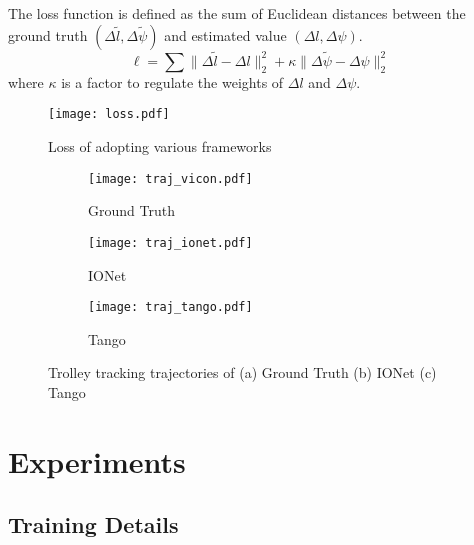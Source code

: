 \documentclass[letterpaper]{article}
\begin{document}
	The loss function is defined as the sum of Euclidean distances between the ground truth $(\Delta \tilde{l}, \Delta \tilde{\psi})$ and estimated value $(\Delta l, \Delta \psi)$. 
	\begin{equation}
    	\ell=\sum \|\Delta \tilde{l} - \Delta l \|_2^2+\kappa \|\Delta \tilde{\psi} - \Delta \psi \|_2^2
    \end{equation}
	where $\kappa$ is a factor to regulate the weights of $\Delta l$ and $\Delta \psi$.

	\begin{figure}
    	\centering
        \texttt{[image: loss.pdf]}
        \caption{\label{fig:loss}Loss of adopting various frameworks}
    \end{figure}

	 \begin{figure*}
    	\centering
        \begin{subfigure}[t]{0.32\textwidth}
        	\texttt{[image: traj\_vicon.pdf]}
        	\caption{\label{fig:traj_vicon} Ground Truth}
        \end{subfigure}
        \begin{subfigure}[t]{0.32\textwidth}
        	\texttt{[image: traj\_ionet.pdf]}
        	\caption{\label{fig:traj_ionet} IONet}
        \end{subfigure}
        \begin{subfigure}[t]{0.32\textwidth}
        	\texttt{[image: traj\_tango.pdf]}
        	\caption{\label{fig:traj_tango} Tango}
        \end{subfigure}
        \caption{\label{fig:traj_trolley} Trolley tracking trajectories of (a) Ground Truth (b) IONet (c) Tango}
    \end{figure*} 
 
\section{Experiments}

\subsection{Training Details}
\end{document}
